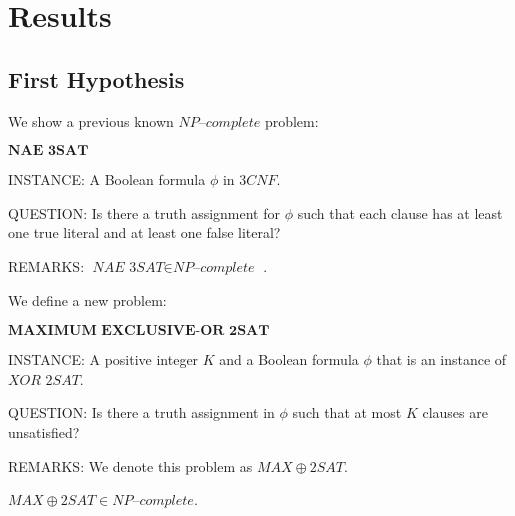 \documentclass[a4paper,UKenglish,cleveref, autoref]{lipics-v2019}
\begin{document}
\section{Results}

\subsection{First Hypothesis}

We show a previous known $\textit{NP--complete}$ problem:

\begin{definition}
$\textbf{NAE 3SAT}$

INSTANCE: A Boolean formula $\phi$ in $3CNF$.

QUESTION: Is there a truth assignment for $\phi$ such that each clause has at least one true literal and at least one false literal?

REMARKS: $\textit{NAE 3SAT} \in \textit{NP--complete}$ \cite{GJ79}.
\end{definition}

We define a new problem:

\begin{definition}
$\textbf{MAXIMUM EXCLUSIVE-OR 2SAT}$

INSTANCE: A positive integer $K$ and a Boolean formula $\phi$ that is an instance of $\textit{XOR 2SAT}$.

QUESTION: Is there a truth assignment in $\phi$ such that at most $K$ clauses are unsatisfied?

REMARKS: We denote this problem as $MAX\oplus2SAT$.
\end{definition}


\begin{theorem}
\label{completeness}
$MAX\oplus2SAT \in \textit{NP--complete}$.
\end{theorem}
\end{document}
